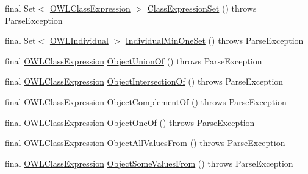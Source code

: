 \begin{DoxyCompactItemize}
\item 
final Set$<$ \hyperlink{interfaceorg_1_1semanticweb_1_1owlapi_1_1model_1_1_o_w_l_class_expression}{O\-W\-L\-Class\-Expression} $>$ \hyperlink{classorg_1_1coode_1_1owlapi_1_1functionalparser_1_1_o_w_l_functional_syntax_parser_af5a66c0b3dc5a60c9e6cffd25762c5ea}{Class\-Expression\-Set} ()  throws Parse\-Exception 
\item 
final Set$<$ \hyperlink{interfaceorg_1_1semanticweb_1_1owlapi_1_1model_1_1_o_w_l_individual}{O\-W\-L\-Individual} $>$ \hyperlink{classorg_1_1coode_1_1owlapi_1_1functionalparser_1_1_o_w_l_functional_syntax_parser_a3bf1948cb9308690f4c33579a8963ee5}{Individual\-Min\-One\-Set} ()  throws Parse\-Exception 
\item 
final \hyperlink{interfaceorg_1_1semanticweb_1_1owlapi_1_1model_1_1_o_w_l_class_expression}{O\-W\-L\-Class\-Expression} \hyperlink{classorg_1_1coode_1_1owlapi_1_1functionalparser_1_1_o_w_l_functional_syntax_parser_a8d7ad15c226521481c2e009d29956f60}{Object\-Union\-Of} ()  throws Parse\-Exception 
\item 
final \hyperlink{interfaceorg_1_1semanticweb_1_1owlapi_1_1model_1_1_o_w_l_class_expression}{O\-W\-L\-Class\-Expression} \hyperlink{classorg_1_1coode_1_1owlapi_1_1functionalparser_1_1_o_w_l_functional_syntax_parser_a37e551bc4829ed0d8d8f63c1eca0a318}{Object\-Intersection\-Of} ()  throws Parse\-Exception 
\item 
final \hyperlink{interfaceorg_1_1semanticweb_1_1owlapi_1_1model_1_1_o_w_l_class_expression}{O\-W\-L\-Class\-Expression} \hyperlink{classorg_1_1coode_1_1owlapi_1_1functionalparser_1_1_o_w_l_functional_syntax_parser_ad5578a571ff415f0974d7a091630a056}{Object\-Complement\-Of} ()  throws Parse\-Exception 
\item 
final \hyperlink{interfaceorg_1_1semanticweb_1_1owlapi_1_1model_1_1_o_w_l_class_expression}{O\-W\-L\-Class\-Expression} \hyperlink{classorg_1_1coode_1_1owlapi_1_1functionalparser_1_1_o_w_l_functional_syntax_parser_a48b60e4674e7fbc76b5b4bb477920a58}{Object\-One\-Of} ()  throws Parse\-Exception 
\item 
final \hyperlink{interfaceorg_1_1semanticweb_1_1owlapi_1_1model_1_1_o_w_l_class_expression}{O\-W\-L\-Class\-Expression} \hyperlink{classorg_1_1coode_1_1owlapi_1_1functionalparser_1_1_o_w_l_functional_syntax_parser_a4ec9590920e65953703b5d3f7f236302}{Object\-All\-Values\-From} ()  throws Parse\-Exception 
\item 
final \hyperlink{interfaceorg_1_1semanticweb_1_1owlapi_1_1model_1_1_o_w_l_class_expression}{O\-W\-L\-Class\-Expression} \hyperlink{classorg_1_1coode_1_1owlapi_1_1functionalparser_1_1_o_w_l_functional_syntax_parser_a26998454dcf58d05a8a72634aeaa15b2}{Object\-Some\-Values\-From} ()  throws Parse\-Exception 

\end{DoxyCompactItemize}
